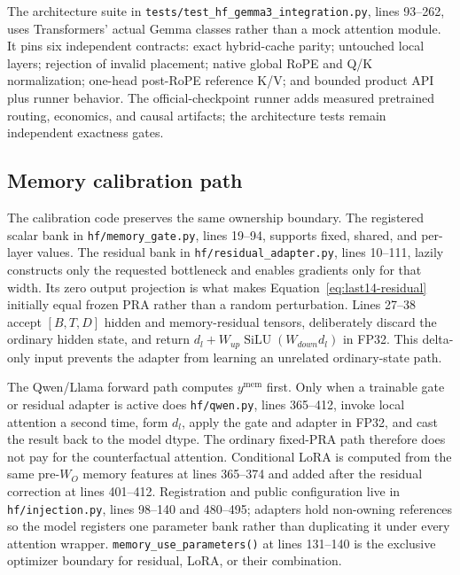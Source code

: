 \documentclass[11pt]{article}
\begin{document}
The architecture suite in \texttt{tests/test\_hf\_gemma3\_integration.py}, lines 93--262, uses
Transformers' actual Gemma classes rather than a mock attention module. It pins six independent
contracts: exact hybrid-cache parity; untouched local layers; rejection of invalid placement;
native global RoPE and Q/K normalization; one-head post-RoPE reference K/V; and bounded product
API plus runner behavior. The official-checkpoint runner adds measured pretrained routing,
economics, and causal artifacts; the architecture tests remain independent exactness gates.

\subsection{Memory calibration path}

The calibration code preserves the same ownership boundary. The registered scalar bank in
\texttt{hf/memory\_gate.py}, lines 19--94, supports fixed, shared, and per-layer values. The
residual bank in \texttt{hf/residual\_adapter.py}, lines 10--111, lazily constructs only the
requested bottleneck and enables gradients only for that width. Its zero output projection is
what makes Equation~\ref{eq:last14-residual} initially equal frozen PRA rather than a random
perturbation. Lines 27--38 accept $[B,T,D]$ hidden and memory-residual tensors, deliberately
discard the ordinary hidden state, and return $d_l+W_{up}\operatorname{SiLU}(W_{down}d_l)$ in
FP32. This delta-only input prevents the adapter from learning an unrelated ordinary-state path.

The Qwen/Llama forward path computes $y^{\mathrm{mem}}$ first. Only when a trainable gate or
residual adapter is active does \texttt{hf/qwen.py}, lines 365--412, invoke local attention a
second time, form $d_l$, apply the gate and adapter in FP32, and cast the result back to the
model dtype. The ordinary fixed-PRA path therefore does not pay for the counterfactual
attention. Conditional LoRA is computed from the same pre-$W_O$ memory features at lines
365--374 and added after the residual correction at lines 401--412. Registration and public
configuration live in \texttt{hf/injection.py}, lines 98--140 and 480--495; adapters hold
non-owning references so the model registers one parameter bank rather than duplicating it under
every attention wrapper. \texttt{memory\_use\_parameters()} at lines 131--140 is the exclusive
optimizer boundary for residual, LoRA, or their combination.
\end{document}
